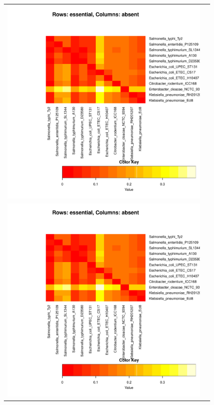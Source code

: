 \documentclass[a4paper,10pt, twocolumn]{article}
\begin{document}
\begin{figure}
\begin{tabular}{c c}
\includegraphics[page=2, scale=0.35]{essentiality-heatmap.pdf} \\
\includegraphics[page=3, scale=0.35]{essentiality-heatmap.pdf} & 

\end{tabular}
\end{figure}
\end{document}
